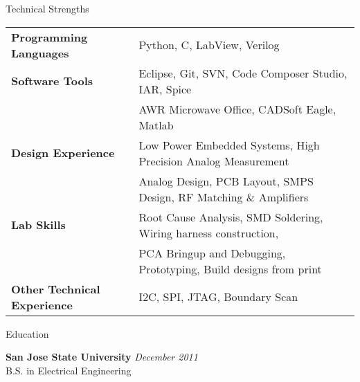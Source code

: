 \documentclass{resume} %
\begin{document}
\begin{rSection}{Technical Strengths}

\begin{tabular}{ @{} >{\bfseries}l @{\hspace{6ex}} l }
Programming Languages & Python, C, LabView, Verilog \smallskip \\

Software Tools & Eclipse, Git, SVN, Code Composer Studio, IAR, Spice\\ 
 & AWR Microwave Office, CADSoft Eagle, Matlab \smallskip \\

Design Experience & Low Power Embedded Systems, High Precision Analog Measurement \\ 
 & Analog Design, PCB Layout, SMPS Design, RF Matching \& Amplifiers \smallskip \\
 
Lab Skills & Root Cause Analysis, SMD Soldering, Wiring harness construction,\\
 & PCA Bringup and Debugging, Prototyping, Build designs from print\smallskip \\
 
Other Technical Experience & I2C, SPI, JTAG, Boundary Scan \\
\end{tabular}

\end{rSection}
\medskip

\pagebreak[3]
\begin{rSection}{Education}

{\bf San Jose State University} \hfill {\em December 2011} \\ 
B.S. in Electrical Engineering \\

\end{rSection}





\end{document}
